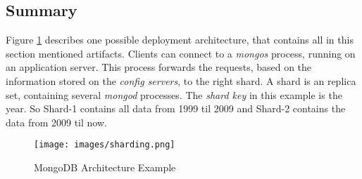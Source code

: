 \subsection{Summary}
Figure \ref{arch-example} describes one possible deployment architecture, that contains all in this section mentioned artifacts. Clients can connect to a \textit{mongos} process, running on an application server. This process forwards the requests, based on the information stored on the \textit{config servers}, to the right shard. A shard is an replica set, containing several \textit{mongod} processes. The \textit{shard key} in this example is the year. So Shard-1 contains all data from 1999 til 2009 and Shard-2 contains the data from 2009 til now. 
\begin{figure}[H]
\texttt{[image: images/sharding.png]}
\caption{MongoDB Architecture Example}
\label{arch-example}
\end{figure}